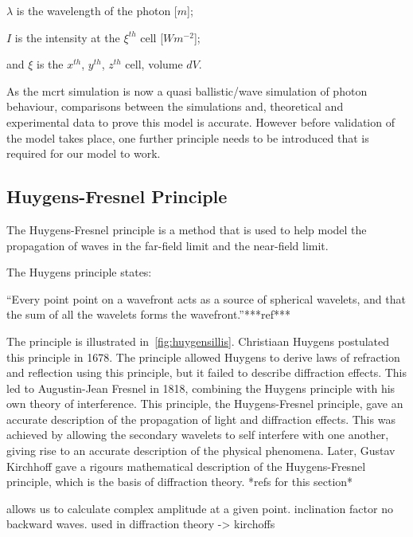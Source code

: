 \indent $\lambda$ is the wavelength of the photon [$m$];

\indent $I$ is the intensity at the $\xi^{th}$ cell [$W m^{-2}$];

\indent and $\xi$ is the $x^{th}$, $y^{th}$, $z^{th}$ cell, volume $dV$.

\medskip

As the \gls{mcrt} simulation is now a quasi ballistic/wave simulation of photon behaviour, comparisons between the simulations and, theoretical and experimental data to prove this model is accurate. However before validation of the model takes place, one further principle needs to be introduced that is required for our model to work.

\subsection{Huygens-Fresnel Principle}

The Huygens-Fresnel principle is a method that is used to help model the propagation of waves in the far-field limit and the near-field limit. 

The Huygens principle states: 

\medskip

``Every point point on a wavefront acts as a source of spherical wavelets, and that the sum of all the wavelets forms the wavefront.''***ref***

\medskip

The principle is illustrated in~\cref{fig:huygensillis}. Christiaan Huygens postulated this principle in 1678.
The principle allowed Huygens to derive laws of refraction and reflection using this principle, but it failed to describe diffraction effects.
This led to Augustin-Jean Fresnel in 1818, combining the Huygens principle with his own theory of interference.
This principle, the Huygens-Fresnel principle, gave an accurate description of the propagation of light and diffraction effects.
This was achieved by allowing the secondary wavelets to self interfere with one another, giving rise to an accurate description of the physical phenomena.
Later, Gustav Kirchhoff gave a rigours mathematical description of the Huygens-Fresnel principle, which is the basis of diffraction theory. *refs for this section*





allows us to calculate complex amplitude at a given point. 
inclination factor no backward waves.
used in diffraction theory -> kirchoffs


